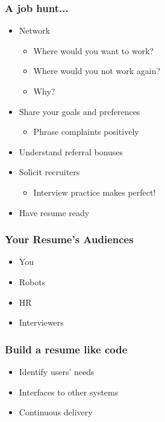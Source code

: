 \documentclass{beamer}
\begin{document}
\begin{frame}
 \frametitle{A job hunt...}



\begin{itemize}
  \item Network
\begin{itemize}
  \item Where would you want to work?
  \item Where would you not work again?
  \item Why?
\end{itemize}
  \item Share your goals and preferences
\begin{itemize}
  \item Phrase complaints positively
\end{itemize}
  \item Understand referral bonuses
  \item Solicit recruiters
\begin{itemize}
  \item Interview practice makes perfect!
\end{itemize}
  \item Have resume ready
\end{itemize}


\end{frame}
\begin{frame}
 \frametitle{Your Resume's Audiences}



\begin{itemize}
  \item You
  \item Robots
  \item HR
  \item Interviewers
\end{itemize}


\end{frame}
\begin{frame}
 \frametitle{Build a resume like code}



\begin{itemize}
  \item Identify users' needs
  \item Interfaces to other systems
  \item Continuous delivery
\end{itemize}


\end{frame}
\end{document}
